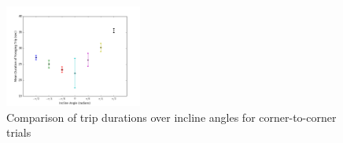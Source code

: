 \begin{figure}[!htb]
\includegraphics[width=0.4\textwidth]{img/corner-to-cornermeandurationofforagingtrip.png}
\caption{Comparison of trip durations over incline angles for corner-to-corner trials}
\end{figure}
